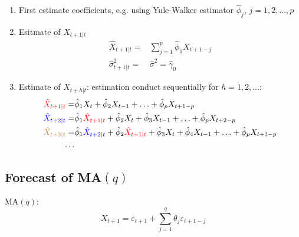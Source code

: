     \begin{enumerate}[topsep=2pt,itemsep=2pt]
        \item First estimate coefficients, e.g. using Yule-Walker estimator $ \hat{\phi }_j $, $ j=1,2,\ldots,p $
        \item Esitmate of $ X_{t+1|t} $
        \begin{align}
            \hat{X}_{t+1|t}= &\sum_{j=1}^p\hat{\phi} _1X_{t+1-j}\\
            \hat{\sigma }_{t+1|t}^2=&\hat{\sigma }^2=\hat{\gamma }_0
        \end{align}
        \item Estimate of $ X_{t+h|t} $: estimation conduct sequentially for $ h=1,2,\ldots $:
        \begin{align}
            {\color{red}\hat{X}_{t+1|t}}= &\hat{\phi} _1X_{t} +\hat{\phi} _2 X_{t-1}+\ldots+\hat{\phi} _pX_{t+1-p} \\
            {\color{blue}\hat{X}_{t+2|t}}= &\hat{\phi} _1{\color{red}\hat{X}_{t+1|t}}+\hat{\phi }_2X_{t}+ \hat{\phi }_3X_{t-1}+ \ldots+ \hat{\phi }_pX_{t+2-p}\\
            {\color{brown}\hat{X}_{t+3|t}}= &\hat{\phi} _1{\color{blue}\hat{X}_{t+2|t}}+\hat{\phi }_2{\color{red}\hat{X}_{t+1|t}}+ \hat{\phi }_3X_{t}+ \hat{\phi }_4X_{t-1} + \ldots+ \hat{\phi }_pX_{t+3-p}\\
            \ldots&
        \end{align}
            
        
        
        
    \end{enumerate}
    
        
\subsection{Forecast of MA$ (q) $}
    MA$ (q) $:
    \begin{equation}
        X_{t+1}=\varepsilon _{t+1}+\sum_{j=1}^q\theta _j\varepsilon _{t+1-j}
    \end{equation}

